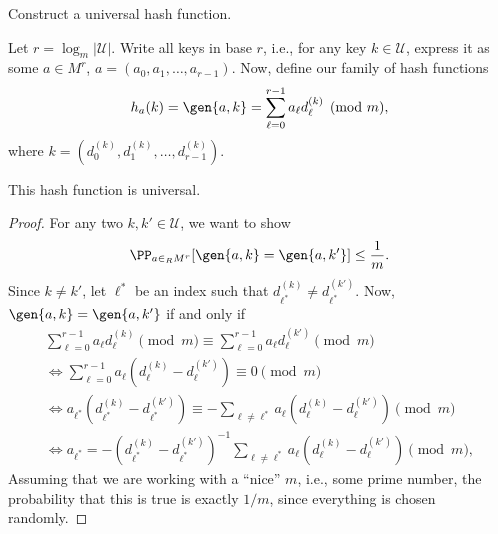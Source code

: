 \begin{example}
\exlabel

Construct a universal hash function.
\end{example}

Let $r = \log_m\vert \mathcal{U}\vert$. Write all keys in base $r$, i.e., for any key $k\in \mathcal{U}$, express it as some $a\in M^r$, $a = (a_0, a_1, \hdots, a_{r-1})$. Now, define our family of hash functions
\[h_a(k) = \gen{a,k} = \sum_{\ell=0}^{r-1}a_{\ell}d_{\ell}^{(k)}\pmod{m},\]
where $k=(d_0^{(k)}, d_1^{(k)}, \hdots, d_{r-1}^{(k)})$.

\begin{theorem}
\thmlabel

This hash function is universal.
\end{theorem}

\begin{proof}
For any two $k,k'\in \mathcal{U}$, we want to show
\begin{align*}
    \PP_{a\in_R M^r}[\gen{a,k} = \gen{a,k'}]\leq \frac{1}{m}.
\end{align*}
Since $k\neq k'$, let $\ell^{*}$ be an index such that $d_{\ell^*}^{(k)}\neq d_{\ell^*}^{(k')}$. Now, $\gen{a,k}=\gen{a,k'}$ if and only if
\begin{align*}
    \sum_{\ell=0}^{r-1}a_{\ell}d_{\ell}^{(k)}\pmod{m} \equiv \sum_{\ell=0}^{r-1}a_{\ell}d_{\ell}^{(k')}\pmod{m} \\
    \iff \sum_{\ell=0}^{r-1}a_{\ell}\left(d_{\ell}^{(k)} - d_{\ell}^{(k')}\right) \equiv 0\pmod{m} \\
    \iff a_{\ell^*}\left(d_{\ell^*}^{(k)} - d_{\ell^*}^{(k')}\right) \equiv -\sum_{\ell\neq \ell^*}a_{\ell}\left(d_{\ell}^{(k)} - d_{\ell}^{(k')}\right)\pmod{m} \\
    \iff a_{\ell^*} = -\left(d_{\ell^*}^{(k)} - d_{\ell^*}^{(k')}\right)^{-1}\sum_{\ell\neq \ell^*}a_{\ell}\left(d_{\ell}^{(k)} - d_{\ell}^{(k')}\right)\pmod{m},
\end{align*}
Assuming that we are working with a ``nice'' $m$, i.e., some prime number, the probability that this is true is exactly $1/m$, since everything is chosen randomly. 
\end{proof}







